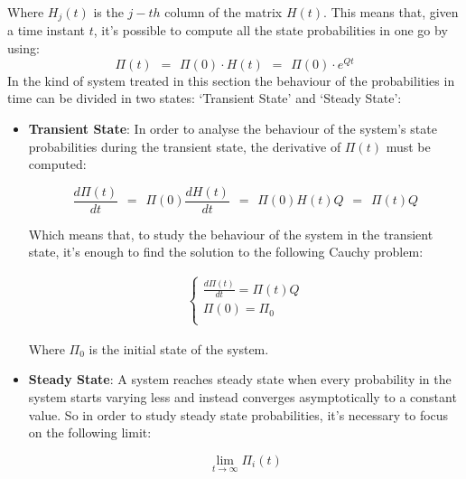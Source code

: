 \documentclass[12pt,a4paper]{article}
\begin{document}
\noindent
Where $H_j(t)$ is the $j-th$ column of the matrix $H(t)$. This means that, given a time instant $t$, it's possible to compute all the state probabilities in one go by using:
$$
\Pi(t)\hspace{5pt}=\hspace{5pt}
\Pi(0)\cdot H(t)\hspace{5pt}=\hspace{5pt}
\Pi(0)\cdot e^{Qt}
$$
In the kind of system treated in this section the behaviour of the probabilities in time can be divided in two states: `Transient State' and `Steady State':
\begin{itemize}
\item \textbf{Transient State}: In order to analyse the behaviour of the system's state probabilities during the transient state, the derivative of $\Pi(t)$ must be computed:

$$
\frac{d\Pi(t)}{dt}
\hspace{5pt}=\hspace{5pt}
\Pi(0)\frac{dH(t)}{dt}
\hspace{5pt}=\hspace{5pt}
\Pi(0)H(t)Q
\hspace{5pt}=\hspace{5pt}
\Pi(t)Q
$$

\noindent
Which means that, to study the behaviour of the system in the transient state, it's enough to find the solution to the following Cauchy problem:

\begin{Large}
$$
\begin{matrix}
\begin{cases}
\frac{d\Pi(t)}{dt}=\Pi(t)Q\\
\Pi(0)=\Pi_0 \\
\end{cases}
\end{matrix}
$$
\end{Large}

\noindent
Where $\Pi_0$ is the initial state of the system.
\item \textbf{Steady State}: A system reaches steady state when every probability in the system starts varying less and instead converges asymptotically to a constant value. So in order to study steady state probabilities, it's necessary to focus on the following limit:

$$
\lim_{t\rightarrow \infty}{\Pi_i(t)}
$$
\end{itemize}
\newpage
\end{document}

